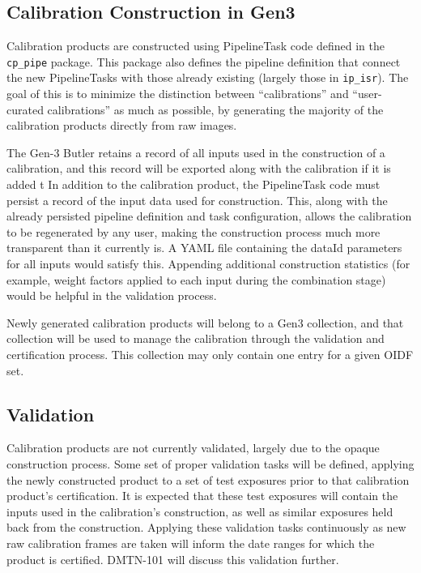 \documentclass[DM,authoryear,toc]{lsstdoc}
\begin{document}
\subsection{Calibration Construction in Gen3}

Calibration products are constructed using PipelineTask code defined
in the \verb|cp_pipe| package.  This package also defines the pipeline
definition that connect the new PipelineTasks with those already
existing (largely those in \verb|ip_isr|).  The goal of this is to
minimize the distinction between ``calibrations'' and ``user-curated
calibrations'' as much as possible, by generating the majority of the
calibration products directly from raw images.

The Gen-3 Butler retains a record of all inputs used in the construction of a calibration, and this record will be exported along with the calibration if it is added t
In addition to the calibration product, the PipelineTask code must
persist a record of the input data used for construction.  This, along
with the already persisted pipeline definition and task configuration,
allows the calibration to be regenerated by any user, making the
construction process much more transparent than it currently is.  A
YAML file containing the dataId parameters for all inputs would
satisfy this.  Appending additional construction statistics (for
example, weight factors applied to each input during the combination
stage) would be helpful in the validation process.

Newly generated calibration products will belong to a Gen3 collection,
and that collection will be used to manage the calibration through the
validation and certification process.  This collection may only
contain one entry for a given OIDF set.

\subsection{Validation}

Calibration products are not currently validated, largely due to the
opaque construction process.  Some set of proper validation tasks will
be defined, applying the newly constructed product to a set of test
exposures prior to that calibration product's certification.  It is
expected that these test exposures will contain the inputs used in the
calibration's construction, as well as similar exposures held back
from the construction.  Applying these validation tasks continuously
as new raw calibration frames are taken will inform the date ranges
for which the product is certified.  DMTN-101 will discuss this
validation further.
\end{document}
